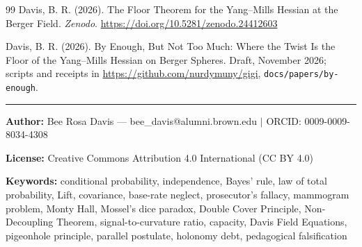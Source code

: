 \documentclass[12pt]{article}
\begin{document}
\begin{thebibliography}{99}
Davis, B. R. (2026). The Floor Theorem for the Yang--Mills Hessian at the Berger Field. \textit{Zenodo}. \url{https://doi.org/10.5281/zenodo.24412603}

Davis, B. R. (2026). By Enough, But Not Too Much: Where the Twist Is the Floor of the Yang--Mills Hessian on Berger Spheres. Draft, November 2026; scripts and receipts in \url{https://github.com/nurdymuny/gigi}, \texttt{docs/papers/by-enough}.

\end{thebibliography}

\vfill

\noindent\rule{\textwidth}{0.4pt}

{\small \noindent \textbf{Author:} Bee Rosa Davis --- bee\_davis@alumni.brown.edu $\mid$ ORCID: 0009-0009-8034-4308

\noindent \textbf{License:} Creative Commons Attribution 4.0 International (CC BY 4.0)

\noindent \textbf{Keywords:} conditional probability, independence, Bayes' rule, law of total probability, Lift, covariance, base-rate neglect, prosecutor's fallacy, mammogram problem, Monty Hall, Mossel's dice paradox, Double Cover Principle, Non-Decoupling Theorem, signal-to-curvature ratio, capacity, Davis Field Equations, pigeonhole principle, parallel postulate, holonomy debt, pedagogical falsification}
\end{document}

